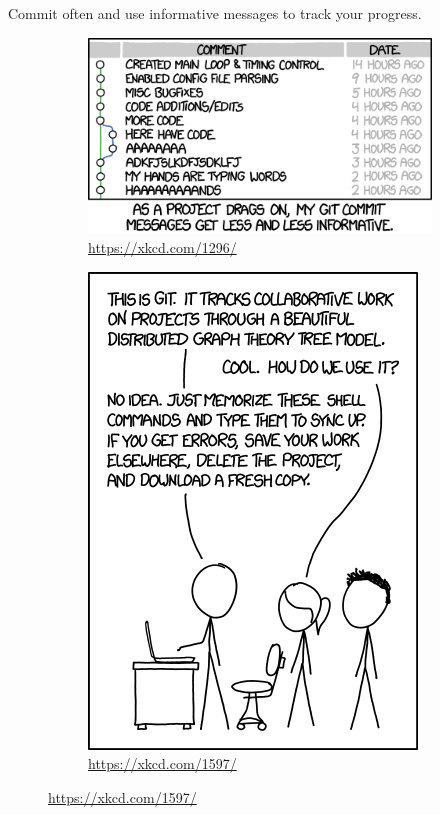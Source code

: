 Commit often and use informative messages to track your progress.

\begin{figure}[H]
\captionsetup[subfigure]{justification=centering}
\centering
\begin{subfigure}{.6\textwidth}
    \centering
    \includegraphics[width=\linewidth]{xkcd2.png}
    \caption{\url{https://xkcd.com/1296/}}
\end{subfigure}
\quad
\begin{subfigure}{.35\textwidth}
    \centering
    \includegraphics[width=\linewidth]{xkcd1.png}
    \caption{\url{https://xkcd.com/1597/}}
\end{subfigure}
\end{figure}

